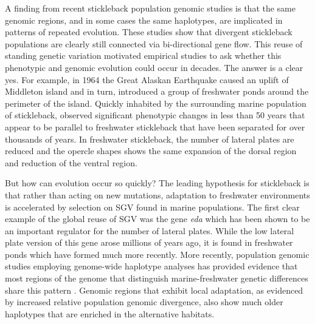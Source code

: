 \documentclass{article}
\begin{document}
A finding from recent stickleback population genomic studies is that the same genomic regions, and in some cases the same haplotypes, are implicated in patterns of repeated evolution. These studies show that divergent stickleback populations are clearly still connected via bi-directional gene flow. This reuse of standing genetic variation motivated empirical studies to ask whether this phenotypic and genomic evolution could occur in decades. The answer is a clear yes. For example, in 1964 the Great Alaskan Earthquake caused an uplift of Middleton island and in turn, introduced a group of freshwater ponds around the perimeter of the island. Quickly inhabited by the surrounding marine population of stickleback, \citet{lescak2015evolution} observed significant phenotypic changes in less than 50 years that appear to be parallel to freshwater stickleback that have been separated for over thousands of years. In freshwater stickleback, the number of lateral plates are reduced and the opercle shapes shows the same expansion of the dorsal region and reduction of the ventral region.

 But how can evolution occur so quickly? The leading hypothesis for stickleback is that rather than acting on new mutations, adaptation to freshwater environments is accelerated by selection on SGV found in marine populations. The first clear example of the global reuse of SGV was the gene \textit{eda} which has been shown to be an important regulator for the number of lateral plates. While the low lateral plate version of this gene arose millions of years ago, it is found in freshwater ponds which have formed much more recently. More recently, population genomic studies employing genome-wide haplotype analyses has provided evidence that most regions of the genome that distinguish marine-freshwater genetic differences share this pattern \citep{nelson2017ancient}. Genomic regions that exhibit local adaptation, as evidenced by increased relative population genomic divergence, also show much older haplotypes that are enriched in the alternative habitats. 
 
\end{document}
